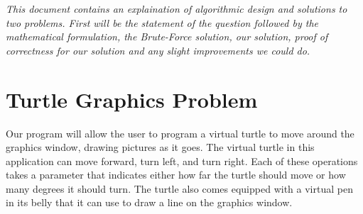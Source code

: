 \documentclass[12pt]{article}
\begin{document}

\newcommand{\hmwkClass}{COS 255}
\newcommand{\hmwkSemester}{Spring 2016}

\newcommand{\hmwkAuthorName}{Annamalis \& Lukas}
\newcommand{\hmwkAuthorID}{asharp \& lleung}

\newcommand{\hmwkAssignmentNum}{0}

\newcommand{\hmwkProblemNum}{1}

\newcommand{\hmwkCollaborators}{asharp}
\thispagestyle{fancycollab}


\noindent
{\em This document contains an explaination of algorithmic design and solutions to two problems.
 First will be the statement of the question followed by the mathematical formulation, the
 Brute-Force solution, our solution, proof of correctness for our solution and any slight
 improvements we could do.}


\section{Turtle Graphics Problem}
Our program will allow the user to program a virtual turtle to move around the graphics window, drawing
pictures as it goes. The  virtual  turtle  in  this application can move forward, turn left, and turn
right. Each of these operations takes a parameter that indicates either how far the turtle should move
or how many degrees it should turn. The turtle also comes equipped with a virtual pen in its belly
that it can use to draw a line on the graphics window.


\newpage

\end{document}
